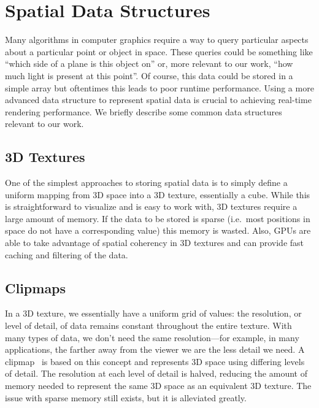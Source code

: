 

\section{Spatial Data Structures}
Many algorithms in computer graphics require a way to query particular aspects about a particular point or object in space. These queries could be something like ``which side of a plane is this object on'' or, more relevant to our work, ``how much light is present at this point''. Of course, this data could be stored in a simple array but oftentimes this leads to poor runtime performance. Using a more advanced data structure to represent spatial data is crucial to achieving real-time rendering performance. We briefly describe some common data structures relevant to our work.

\subsection{3D Textures}
One of the simplest approaches to storing spatial data is to simply define a uniform mapping from 3D space into a 3D texture, essentially a cube. While this is straightforward to visualize and is easy to work with, 3D textures require a large amount of memory. If the data to be stored is sparse (i.e.\ most positions in space do not have a corresponding value) this memory is wasted. Also, GPUs are able to take advantage of spatial coherency in 3D textures and can provide fast caching and filtering of the data.

\subsection{Clipmaps}
In a 3D texture, we essentially have a uniform grid of values: the resolution, or level of detail, of data remains constant throughout the entire texture. With many types of data, we don't need the same resolution---for example, in many applications, the farther away from the viewer we are the less detail we need. A clipmap~\cite{Tanner:1998:CVM:280814.280855, Losasso:2004:GCT:1186562.1015799} is based on this concept and represents 3D space using differing levels of detail. The resolution at each level of detail is halved, reducing the amount of memory needed to represent the same 3D space as an equivalent 3D texture. The issue with sparse memory still exists, but it is alleviated greatly.

